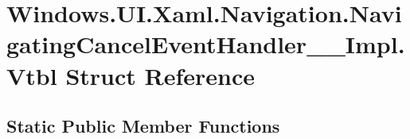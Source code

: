 \hypertarget{struct_windows_1_1_u_i_1_1_xaml_1_1_navigation_1_1_navigating_cancel_event_handler_____impl_1_1_vtbl}{}\section{Windows.\+U\+I.\+Xaml.\+Navigation.\+Navigating\+Cancel\+Event\+Handler\+\_\+\+\_\+\+Impl.\+Vtbl Struct Reference}
\label{struct_windows_1_1_u_i_1_1_xaml_1_1_navigation_1_1_navigating_cancel_event_handler_____impl_1_1_vtbl}
\subsection*{Static Public Member Functions}
